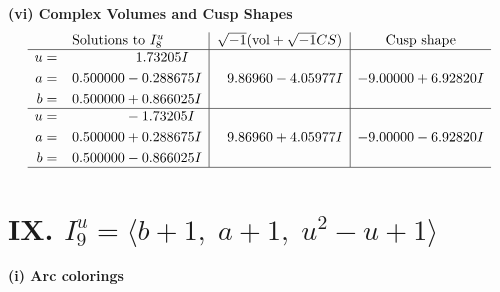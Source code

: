 \documentclass[1p]{elsarticle_modified}
\theoremstyle{definition}
\newcommand{\I}{\sqrt{-1}}
\begin{document}
\newpage\flushleft \textbf{(vi) Complex Volumes and Cusp Shapes}
$$\begin{array}{c|c|c}  
\text{Solutions to }I^u_{8}& \I (\text{vol} + \sqrt{-1}CS) & \text{Cusp shape}\\
 \hline 
\begin{aligned}
u &= \phantom{-0.000000 -}1.73205 I \\
a &= \phantom{-}0.500000 - 0.288675 I \\
b &= \phantom{-}0.500000 + 0.866025 I\end{aligned}
 & \phantom{-}9.86960 - 4.05977 I & -9.00000 + 6.92820 I \\ \hline\begin{aligned}
u &= \phantom{-0.000000 } -1.73205 I \\
a &= \phantom{-}0.500000 + 0.288675 I \\
b &= \phantom{-}0.500000 - 0.866025 I\end{aligned}
 & \phantom{-}9.86960 + 4.05977 I & -9.00000 - 6.92820 I\\
 \hline 
 \end{array}$$\newpage\newpage\renewcommand{\arraystretch}{1}
\centering \section*{IX. $I^u_{9}= \langle b+1,\;a+1,\;u^2- u+1 \rangle$}
\flushleft \textbf{(i) Arc colorings}\\
\end{document}
